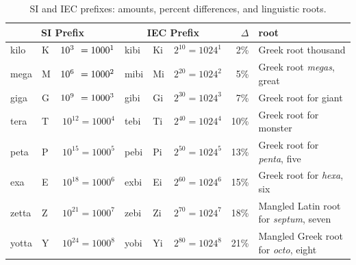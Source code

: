 \begin{table}
\begin{tabular}{||llr|llr|rl|}
\multicolumn{3}{c}{SI Prefix} & \multicolumn{3}{c}{IEC Prefix} & $\Delta$ & root \\ 
\hline
kilo  & K & $10^{3\WZ} = 1000^1 $ & kibi & Ki & $2^{10} = 1024^1 $& 2\% & Greek root {thousand} \\
\hline
mega  & M & $10^{6\WZ} = 1000^2 $ & mibi & Mi & $2^{20} = 1024^2 $& 5\% & Greek root \emph{megas}, {great}\\
\hline
giga  & G & $10^{9\WZ} = 1000^3 $ & gibi & Gi & $2^{30} = 1024^3 $& 7\% & Greek root for {giant}\\
\hline
tera  & T & $10^{12} = 1000^4$ & tebi & Ti & $2^{40} = 1024^4 $& 10\% & Greek root for {monster}\\
\hline
peta  & P & $10^{15} = 1000^5$ & pebi & Pi & $2^{50} = 1024^5 $& 13\% & Greek root for \emph{penta}, {five}\\
\hline
exa   & E & $10^{18} = 1000^6$ & exbi & Ei & $2^{60} = 1024^6 $& 15\% & Greek root for \emph{hexa}, {six}\\
\hline
zetta & Z & $10^{21} = 1000^7$ & zebi & Zi & $2^{70} = 1024^7 $& 18\% & Mangled Latin root for \emph{septum}, {seven}\\
\hline
yotta & Y & $10^{24} = 1000^8$ & yobi & Yi & $2^{80} = 1024^8 $& 21\% & Mangled Greek root for \emph{octo}, {eight}\\
\hline
\hline
\end{tabular}
\caption{SI and IEC prefixes: amounts, percent differences, and
  linguistic roots.}\label{si-iec-differences}
\end{table}






